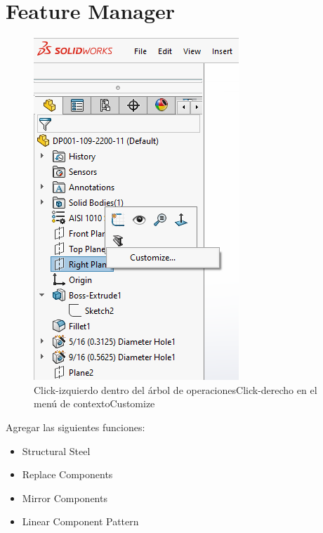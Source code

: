 \documentclass{report}
\begin{document}
\section{Feature Manager}

\begin{figure}[H]
	\centering
	\includegraphics[width=0.85\linewidth, height=0.5\textheight,keepaspectratio]{Imagenes/solidworks_contextmenu_03}
	\caption{Click-izquierdo dentro del árbol de operaciones\textrightarrow Click-derecho en el menú de contexto\textrightarrow Customize}
	\label{fig:solidworkscontextmenu03}
\end{figure}

Agregar las siguientes funciones:

\begin{itemize}
	\item Structural Steel
	\item Replace Components
	\item Mirror Components
	\item Linear Component Pattern
\end{itemize}
\end{document}

